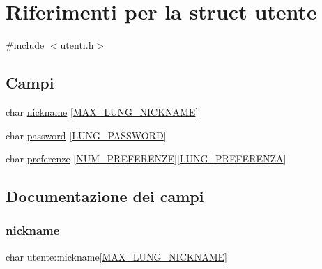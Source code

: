 \hypertarget{structutente}{}\section{Riferimenti per la struct utente}
\label{structutente}


{\ttfamily \#include $<$utenti.\+h$>$}

\subsection*{Campi}
\begin{DoxyCompactItemize}
\item 
char \hyperlink{structutente_ad515f795f0491b1ca59931a2f4a2cc59}{nickname} \mbox{[}\hyperlink{utenti_8h_aee9dc743fce11eb4208a44c1d59ef64c}{M\+A\+X\+\_\+\+L\+U\+N\+G\+\_\+\+N\+I\+C\+K\+N\+A\+ME}\mbox{]}
\item 
char \hyperlink{structutente_a527bf8e8c1c3c8738708d42737b4189f}{password} \mbox{[}\hyperlink{utenti_8h_ad21198b3cb8d2fe2c3d8fb67746bf172}{L\+U\+N\+G\+\_\+\+P\+A\+S\+S\+W\+O\+RD}\mbox{]}
\item 
char \hyperlink{structutente_a249611b72057202c1a4b7a76007e48be}{preferenze} \mbox{[}\hyperlink{utenti_8h_afd3f4e6f098069fc2af012d2e454443a}{N\+U\+M\+\_\+\+P\+R\+E\+F\+E\+R\+E\+N\+ZE}\mbox{]}\mbox{[}\hyperlink{utenti_8h_a0fd5baff776b4f5be964c2f6383f415a}{L\+U\+N\+G\+\_\+\+P\+R\+E\+F\+E\+R\+E\+N\+ZA}\mbox{]}
\end{DoxyCompactItemize}


\subsection{Documentazione dei campi}
\mbox{\label{structutente_ad515f795f0491b1ca59931a2f4a2cc59}} 
\subsubsection{\texorpdfstring{nickname}{nickname}}
{\footnotesize\ttfamily char utente\+::nickname\mbox{[}\hyperlink{utenti_8h_aee9dc743fce11eb4208a44c1d59ef64c}{M\+A\+X\+\_\+\+L\+U\+N\+G\+\_\+\+N\+I\+C\+K\+N\+A\+ME}\mbox{]}}

\mbox{\label{structutente_a527bf8e8c1c3c8738708d42737b4189f}} 
